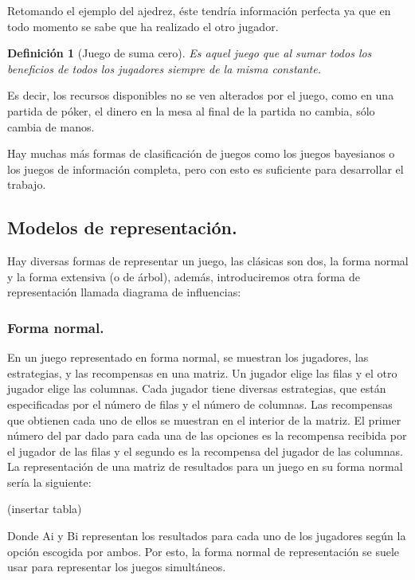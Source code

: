 \documentclass[a4paper]{report} %
\newtheorem{definicion}{Definición}[section]
\begin{document}
Retomando el ejemplo del ajedrez, éste tendría información perfecta ya que en todo momento se sabe que ha realizado el otro jugador.

\begin{definicion}[Juego de suma cero]
Es aquel juego que al sumar todos los beneficios de todos los jugadores siempre de la misma constante.
\end{definicion}

Es decir, los recursos disponibles no se ven alterados por el juego, como en una partida de póker, el dinero en la mesa al final de la partida no cambia, sólo cambia de manos.

Hay muchas más formas de clasificación de juegos como los juegos bayesianos o los juegos de información completa, pero con esto es suficiente para desarrollar el trabajo.

\subsection{Modelos de representación.}

Hay diversas formas de representar un juego, las clásicas son dos, la forma normal y la forma extensiva (o de árbol), además, introduciremos otra forma de representación llamada diagrama de influencias:

\subsubsection{Forma normal.}


En un juego representado en forma normal, se muestran los jugadores, las estrategias, y las recompensas en una matriz. Un jugador elige las filas y el otro jugador elige las columnas. Cada jugador tiene diversas estrategias, que están especificadas por el número de filas y el número de columnas. Las recompensas que obtienen cada uno de ellos se muestran en el interior de la matriz. El primer número del par dado para cada una de las opciones es la recompensa recibida por el jugador de las filas y el segundo es la recompensa del jugador de las columnas. La representación de una matriz de resultados para un juego en su forma normal sería la siguiente: 

(insertar tabla)

Donde Ai y Bi representan los resultados para cada uno de los jugadores según la opción escogida por ambos. Por esto, la forma normal de representación se suele usar para representar los juegos simultáneos.
\end{document}
